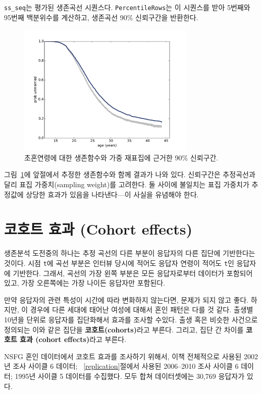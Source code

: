 \verb"ss_seq"는 평가된 생존곡선 시퀀스다. 
{\tt PercentileRows}는 이 시퀀스를 받아 5번째와 95번째 백분위수를 계산하고, 생존곡선 90\% 신뢰구간을 반환한다.

\begin{figure}
\centerline{\includegraphics[height=2.5in]{figs/survival3.pdf}}
\caption{초혼연령에 대한 생존함수와 가중 재표집에 근거한 90\% 신뢰구간.}
\label{survival3}
\end{figure}

그림~\ref{survival3}에 앞절에서 추정한 생존함수와 함께 결과가 나와 있다.
신뢰구간은 추정곡선과 달리 표집 가중치(sampling weight)를 고려한다. 둘 사이에 불일치는 표집 가중치가 추정값에 상당한 효과가 있음을 나타낸다---이 사실을 유념해야 한다.


\section{코호트 효과 (Cohort effects)}

생존분석 도전중의 하나는 추정 곡선의 다른 부분이 응답자의 다른 집단에 기반한다는 것이다. 시점 {\tt t}에 곡선 부분은 인터뷰 당시에 적어도 응답자 연령이 적어도 {\tt t}인 응답자에 기반한다. 그래서, 곡선의 가장 왼쪽 부분은 모든 응답자로부터 데이터가 포함되어 있고, 가장 오른쪽에는 가장 나이든 응답자만 포함된다.

만약 응답자의 관련 특성이 시간에 따라 변화하지 않는다면, 문제가 되지 않고 좋다. 하지만, 이 경우에  다른 세대에 태어난 여성에 대해서 혼인 패턴은 다를 것 같다. 출생별 10년을 단위로 응답자를 집단화해서 효과를 조사할 수있다.
출생 혹은 비슷한 사건으로 정의되는 이와 같은 집단을 {\bf 코호트(cohorts)}라고 부른다. 그리고, 집단 간 차이를 {\bf 코호트 효과 (cohort effects)}라고 부른다.

NSFG 혼인 데이터에서 코호트 효과를 조사하기 위해서, 이책 전체적으로 사용된 2002년 조사 사이클 6 데이터; ~\ref{replication}절에서 사용된 2006--2010 조사 사이클 6 데이터; 1995년 사이클 5 데이터를 수집했다. 모두 합쳐 데이터셋에는 30,769 응답자가 있다.

